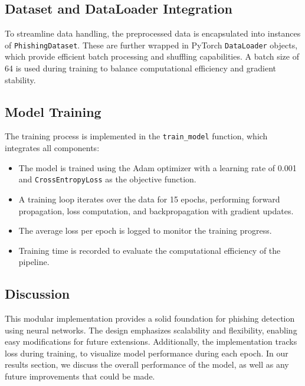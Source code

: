 \subsection{Dataset and DataLoader Integration}
To streamline data handling, the preprocessed data is encapsulated into instances of \texttt{PhishingDataset}. These are further wrapped in PyTorch \texttt{DataLoader} objects, which provide efficient batch processing and shuffling capabilities. A batch size of 64 is used during training to balance computational efficiency and gradient stability.

\subsection{Model Training}
The training process is implemented in the \texttt{train\_model} function, which integrates all components:
\begin{itemize}
    \item The model is trained using the Adam optimizer with a learning rate of 0.001 and \texttt{CrossEntropyLoss} as the objective function.
    \item A training loop iterates over the data for 15 epochs, performing forward propagation, loss computation, and backpropagation with gradient updates.
    \item The average loss per epoch is logged to monitor the training progress.
    \item Training time is recorded to evaluate the computational efficiency of the pipeline.
\end{itemize}

\subsection{Discussion}
This modular implementation provides a solid foundation for phishing detection using neural networks. The design emphasizes scalability and flexibility, enabling easy modifications for future extensions. Additionally, the implementation tracks loss during training, to visualize model performance during each epoch. In our results section, we discuss the overall performance of the model, as well as any future improvements that could be made.
